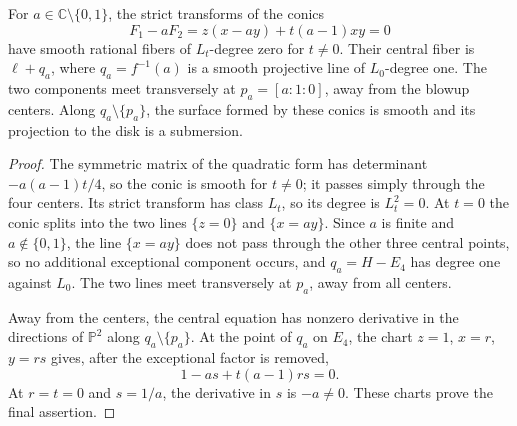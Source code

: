 \begin{lemma}\label{lem:four-point-variable-conics}\label{lem:four-point-conic-degeneration}
For $a\in\mathbb C\setminus\{0,1\}$, the strict transforms of the conics
\[
 F_1-aF_2=z(x-ay)+t(a-1)xy=0
\]
have smooth rational fibers of $L_t$-degree zero for $t\ne0$. Their central fiber is $\ell+q_a$, where $q_a=f^{-1}(a)$ is a smooth projective line of $L_0$-degree one. The two components meet transversely at $p_a=[a:1:0]$, away from the blowup centers. Along $q_a\setminus\{p_a\}$, the surface formed by these conics is smooth and its projection to the disk is a submersion.
\end{lemma}
\begin{proof}
The symmetric matrix of the quadratic form has determinant $-a(a-1)t/4$, so the conic is smooth for $t\ne0$; it passes simply through the four centers. Its strict transform has class $L_t$, so its degree is $L_t^2=0$. At $t=0$ the conic splits into the two lines $\{z=0\}$ and $\{x=ay\}$. Since $a$ is finite and $a\notin\{0,1\}$, the line $\{x=ay\}$ does not pass through the other three central points, so no additional exceptional component occurs, and $q_a=H-E_4$ has degree one against $L_0$. The two lines meet transversely at $p_a$, away from all centers.

Away from the centers, the central equation has nonzero derivative in the directions of $\mathbb P^2$ along $q_a\setminus\{p_a\}$. At the point of $q_a$ on $E_4$, the chart $z=1$, $x=r$, $y=rs$ gives, after the exceptional factor is removed,
\[
 1-as+t(a-1)rs=0.
\]
At $r=t=0$ and $s=1/a$, the derivative in $s$ is $-a\ne0$. These charts prove the final assertion.
\end{proof}

